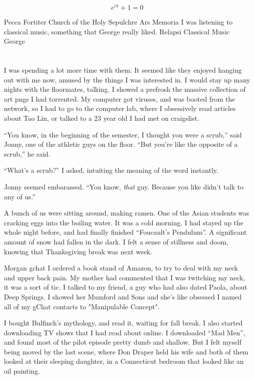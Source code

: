 \begin{equation}
  e^{i\pi} + 1 = 0
\end{equation}
      
Pecca Fortiter
Church of the Holy Sepulchre
Ars Memoria
I was listening to classical music, something that George really liked.
Relapsi
Classical Music
George


\section{}


I was spending a lot more time with them.  It seemed like they enjoyed hanging
out with me now, amused by the things I was interested in.  I would stay up many
nights with the floormates, talking.  I showed a prefrosh the massive collection of
art pngs I had torrented.  My computer got viruses, and was booted from the
network, so I had to go to the computer lab, where I obsessively read articles
about Tao Lin, or talked to a 23 year old I had met on craigslist.  

``You know, in the beginning of the semester, I thought you were a scrub,'' said
Jonny, one of the athletic guys on the floor.  ``But you're like the opposite of
a scrub,'' he said.  

``What's a scrub?''  I asked, intuiting the meaning of the word instantly.

Jonny seemed embarassed.  ``You know, \textit{that} guy.  Because you like
didn't talk to any of us.''  

A bunch of us were sitting around, making ramen.  One of the Asian students was
cracking eggs into the boiling water.  It was a cold morning.  I had stayed up
the whole night before, and had finally finished ``Foucault's
Pendulum''.  A significant amount of snow had fallen in the dark.  I felt a
sense of stillness and doom, knowing that Thanksgiving break was next week.


Morgan gchat
I ordered a book stand of Amazon, to try to deal with my neck and upper back
pain.  My mother had commented that I was twitching my neck, it was a sort of
tic.
I talked to my friend, a guy who had also dated Paola, about Deep Springs. 
I showed her Mumford and Sons and she's like obsessed
I named all of my gChat contacts to "Manipulable Concept".

I bought Bulfinch's mythology, and read it, waiting for fall break.  I also
started downloading TV shows that I had read about online.  I downloaded ``Mad
Men'', and found most of the pilot episode pretty dumb and shallow.  But I felt
myself being moved by the last scene, where Don Draper held his wife and both of
them looked at their sleeping daughter, in a Connecticut bedroom that looked
like an oil painting.

